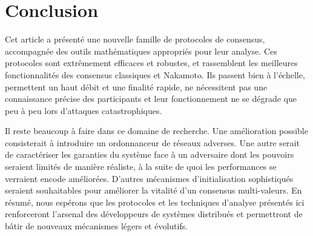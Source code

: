 \documentclass[letterpaper,twocolumn,10pt]{article}
\newcommand{\tronly}[2]{#1}
\theoremstyle{definition}
\begin{document}
\section{Conclusion}
\label{sec:conclusions}
Cet article a présenté une nouvelle famille de protocoles de consensus, accompagnée des outils mathématiques appropriés pour leur analyse.
\tronly{Ces protocoles sont extrêmement efficaces et robustes, et rassemblent les meilleures fonctionnalités des consensus classiques et Nakamoto.}{} 
Ils passent bien à l'échelle, permettent un haut débit et une finalité rapide, ne nécessitent pas une connaissance précise des participants et leur fonctionnement ne se dégrade que peu à peu lors d'attaques catastrophiques.

Il reste beaucoup à faire dans ce domaine de recherche. \tronly{
Une amélioration possible consisterait à introduire un ordonnanceur de réseaux adverses. %
Une autre}{Une} serait de caractériser les garanties du système face à un adversaire dont les pouvoirs seraient limités de manière réaliste, à la suite de quoi les performances se verraient encode améliorées. \tronly{D'autres}{Plus} mécanismes d'initialisation sophistiqués seraient souhaitables pour améliorer la vitalité d'un consensus multi-valeurs. 
En résumé, nous espérons que les protocoles et les techniques d'analyse présentés ici renforceront l'arsenal des développeurs de systèmes distribués et permettront de bâtir de nouveaux mécanismes légers et évolutifs.
\end{document}
